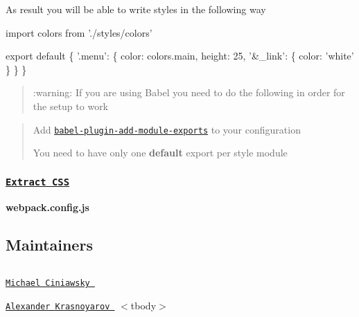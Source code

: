 As result you will be able to write styles in the following way


\begin{DoxyCode}
import colors from './styles/colors'

export default \{
    '.menu': \{
      color: colors.main,
      height: 25,
      '&\_link': \{
      color: 'white'
    \}
  \}
\}
\end{DoxyCode}


\begin{quote}
\+:warning\+: If you are using Babel you need to do the following in order for the setup to work \end{quote}


\begin{quote}

\begin{DoxyEnumerate}
\item Add \href{https://github.com/59naga/babel-plugin-add-module-exports}{\tt babel-\/plugin-\/add-\/module-\/exports} to your configuration
\item You need to have only one {\bfseries default} export per style module 
\end{DoxyEnumerate}\end{quote}


\subsubsection*{\href{https://github.com/webpack-contrib/extract-text-webpack-plugin}{\tt Extract C\+SS}}

{\bfseries webpack.\+config.\+js} 


\subsection*{Maintainers}

\tabulinesep=1mm
\begin{longtabu} spread 0pt [c]{*{0}{|X[-1]}|}
\hline
\end{longtabu}


\href{https://github.com/michael-ciniawsky}{\tt Michael Ciniawsky }  

\href{https://github.com/evilebottnawi}{\tt Alexander Krasnoyarov }   $<$tbody$>$ 